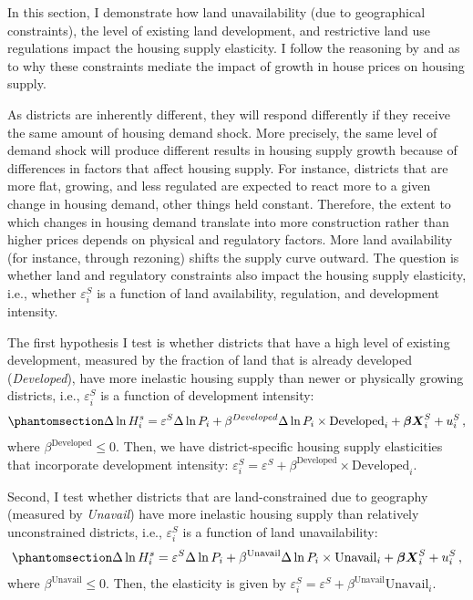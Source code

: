\documentclass[
  12pt,
]{article}
\begin{document}
In this section, I demonstrate how land unavailability (due to
geographical constraints), the level of existing land development, and
restrictive land use regulations impact the housing supply elasticity. I
follow the reasoning by \citet{saiz_2010} and \citet{baum-snow_han_2019}
as to why these constraints mediate the impact of growth in house prices
on housing supply.

As districts are inherently different, they will respond differently if
they receive the same amount of housing demand shock. More precisely,
the same level of demand shock will produce different results in housing
supply growth because of differences in factors that affect housing
supply. For instance, districts that are more flat, growing, and less
regulated are expected to react more to a given change in housing
demand, other things held constant. Therefore, the extent to which
changes in housing demand translate into more construction rather than
higher prices depends on physical and regulatory factors. More land
availability (for instance, through rezoning) shifts the supply curve
outward. The question is whether land and regulatory constraints also
impact the housing supply elasticity, i.e., whether \(\varepsilon^S_i\)
is a function of land availability, regulation, and development
intensity.

The first hypothesis I test is whether districts that have a high level
of existing development, measured by the fraction of land that is
already developed (\emph{Developed}), have more inelastic housing supply
than newer or physically growing districts, i.e., \(\varepsilon^S_i\) is
a function of development intensity:
\begin{equation}\protect\phantomsection\label{eq-case-2}{
\Delta\ln H_i^s = \varepsilon^S\Delta\ln P_i + \beta^{Developed} \Delta \ln P_i\times\text{Developed}_i + \boldsymbol{\beta}\boldsymbol{X}_i^S + u^S_i\,,
}\end{equation} where \(\beta^{\text{Developed}} \le 0\). Then, we have
district-specific housing supply elasticities that incorporate
development intensity:
\(\varepsilon^S_i = \varepsilon^S + \beta^{\text{Developed}}\times\text{Developed}_i\).

Second, I test whether districts that are land-constrained due to
geography (measured by \emph{Unavail}) have more inelastic housing
supply than relatively unconstrained districts, i.e.,
\(\varepsilon^S_i\) is a function of land unavailability:
\begin{equation}\protect\phantomsection\label{eq-case-3}{ 
\Delta\ln H_i^s = \varepsilon^S\Delta\ln P_i + \beta^{\text{Unavail}} \Delta \ln P_i\times\text{Unavail}_i + \boldsymbol{\beta}\boldsymbol{X}_i^S + u^S_i\,,
}\end{equation} where \(\beta^{\text{Unavail}} \le 0\). Then, the
elasticity is given by
\(\varepsilon^S_i = \varepsilon^S + \beta^{\text{Unavail}}\text{Unavail}_i\).
\end{document}
